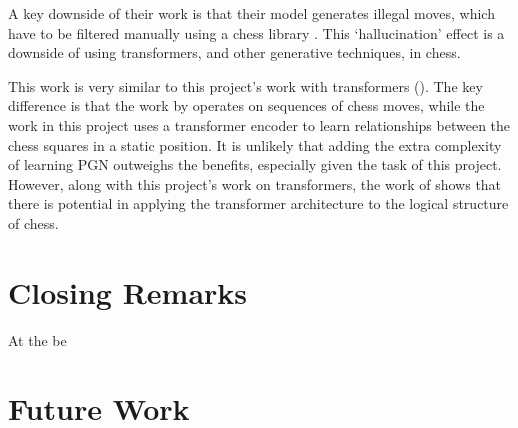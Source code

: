 A key downside of their work is that their model generates illegal moves, which
have to be filtered manually using a chess library \citep{chessTransformer}.
This `hallucination' effect is a downside of using transformers, and other
generative techniques, in chess. 

This work is very similar to this project's work with transformers
(). The key difference is that the work by
\citet{chessTransformer} operates on sequences of chess moves, while the work
in this project uses a transformer encoder to learn relationships between the
chess squares in a static position. It is unlikely that adding the extra
complexity of learning PGN outweighs the benefits, especially given the task of
this project. However, along with this project's work on transformers, the work
of \citet{chessTransformer} shows that there is potential in applying the
transformer architecture to the logical structure of chess.

\section{Closing Remarks}

At the be

\section{Future Work}
